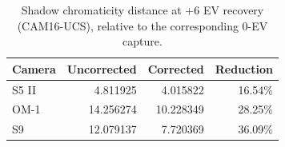 \begin{table}[!t]
\centering
\caption{Shadow chromaticity distance at +6 EV recovery (CAM16-UCS), relative to the corresponding 0-EV capture.}\label{tab:color}
\footnotesize
\setlength{\tabcolsep}{4pt}
\begin{tabular}{lrrr}
\toprule
Camera & Uncorrected & Corrected & Reduction \\
\midrule
S5 II & 4.811925 & 4.015822 & 16.54\% \\
OM-1 & 14.256274 & 10.228349 & 28.25\% \\
S9 & 12.079137 & 7.720369 & 36.09\% \\
\bottomrule
\end{tabular}
\end{table}
